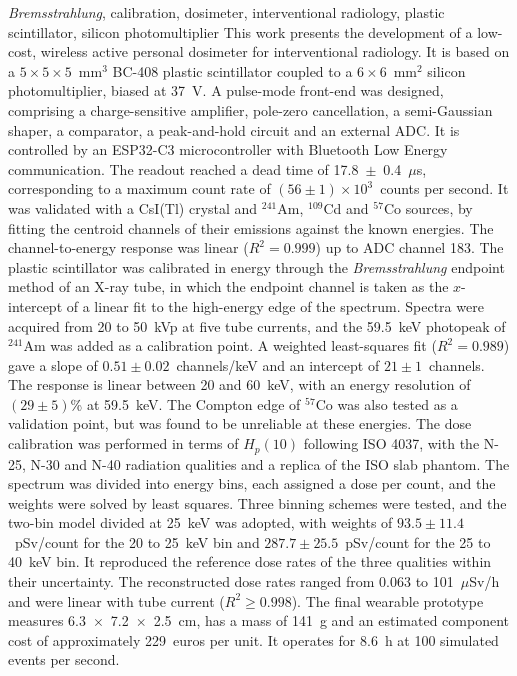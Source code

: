 \documentclass[11pt,twoside,a4paper]{report}
\begin{document}
\TitlePage
  \vspace*{35mm}
      {\emph{Bremsstrahlung}, calibration, dosimeter, interventional radiology, plastic scintillator, silicon photomultiplier}
 \vspace*{15mm}
       {This work presents the development of a low-cost, wireless active personal dosimeter for interventional radiology. It is based on a $5 \times 5 \times 5$~mm$^3$ BC-408 plastic scintillator coupled to a $6 \times 6$~mm$^2$ silicon photomultiplier, biased at 37~V. A pulse-mode front-end was designed, comprising a charge-sensitive amplifier, pole-zero cancellation, a semi-Gaussian shaper, a comparator, a peak-and-hold circuit and an external ADC. It is controlled by an ESP32-C3 microcontroller with Bluetooth Low Energy communication. The readout reached a dead time of 17.8~$\pm$~0.4~$\mu$s, corresponding to a maximum count rate of $(56 \pm 1)\times10^{3}$~counts per second. It was validated with a CsI(Tl) crystal and $^{241}$Am, $^{109}$Cd and $^{57}$Co sources, by fitting the centroid channels of their emissions against the known energies. The channel-to-energy response was linear ($R^2 = 0.999$) up to ADC channel 183.
The plastic scintillator was calibrated in energy through the \emph{Bremsstrahlung} endpoint method of an X-ray tube, in which the endpoint channel is taken as the $x$-intercept of a linear fit to the high-energy edge of the spectrum. Spectra were acquired from 20 to 50~kVp at five tube currents, and the 59.5~keV photopeak of $^{241}$Am was added as a calibration point. A weighted least-squares fit ($R^2 = 0.989$) gave a slope of $0.51 \pm 0.02$~channels/keV and an intercept of $21 \pm 1$~channels. The response is linear between 20 and 60~keV, with an energy resolution of $(29 \pm 5)$\% at 59.5~keV. The Compton edge of $^{57}$Co was also tested as a validation point, but was found to be unreliable at these energies. The dose calibration was performed in terms of $H_p(10)$ following ISO 4037, with the N-25, N-30 and N-40 radiation qualities and a replica of the ISO slab phantom. The spectrum was divided into energy bins, each assigned a dose per count, and the weights were solved by least squares. Three binning schemes were tested, and the two-bin model divided at 25~keV was adopted, with weights of $93.5 \pm 11.4$~pSv/count for the 20 to 25~keV bin and $287.7 \pm 25.5$~pSv/count for the 25 to 40~keV bin. It reproduced the reference dose rates of the three qualities within their uncertainty. The reconstructed dose rates ranged from 0.063 to 101~$\mu$Sv/h and were linear with tube current ($R^2 \geq 0.998$).
The final wearable prototype measures 6.3~$\times$~7.2~$\times$~2.5~cm, has a mass of 141~g and an estimated component cost of approximately 229~euros per unit. It operates for 8.6~h at 100 simulated events per second.}
      {\hspace{5mm}}
\EndTitlePage
\end{document}
